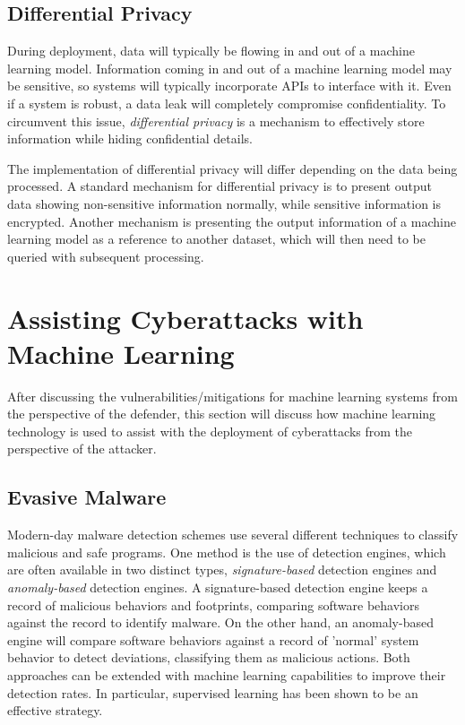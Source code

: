 \documentclass[11pt,conference]{IEEEtran}
\begin{document}
\subsection{Differential Privacy}
During deployment, data will typically be flowing in and out of a machine
learning model. Information coming in and out of a machine learning model may be sensitive, so
systems will typically incorporate APIs to interface with it. Even if a system
is robust, a data leak will completely compromise confidentiality. To
circumvent this issue, \emph{differential privacy} is a mechanism to
effectively store
information while hiding confidential details.

The implementation of differential privacy will differ depending on the data
being processed. A standard mechanism for differential privacy is to present
output data showing non-sensitive information normally, while sensitive
information is encrypted. Another mechanism is presenting the output
information of a machine learning model as a reference to another dataset, which
will then need to be queried with subsequent processing.

\section{Assisting Cyberattacks with Machine Learning}
After discussing the vulnerabilities/mitigations for machine learning systems
from the perspective of the defender, this section will discuss how machine
learning technology is used to assist with the deployment of cyberattacks from
the perspective of the attacker.

\subsection{Evasive Malware}
Modern-day malware detection schemes use several different techniques to
classify malicious and safe programs. One method is the use of detection
engines, which are often available in two distinct types,
\emph{signature-based} detection engines and \emph{anomaly-based} detection
engines. A signature-based detection engine keeps a record of malicious
behaviors and footprints, comparing software behaviors against the record to
identify malware. On the other hand, an anomaly-based engine will
compare software behaviors against a record of 'normal' system behavior to
detect deviations, classifying them as malicious actions. Both approaches can be extended with machine learning
capabilities to improve their detection rates. In particular, supervised
learning has been shown to be an effective strategy.
\end{document}
